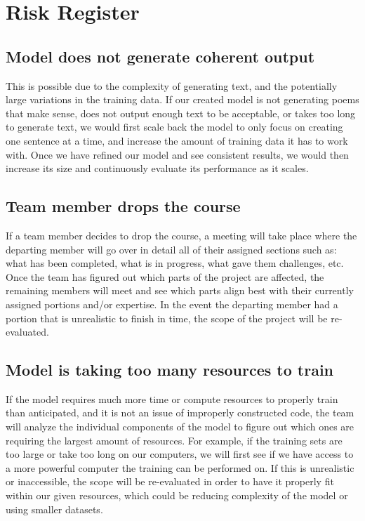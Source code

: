 \documentclass{article} %
\begin{document}
\section{Risk Register}
\label{risk_register}

\subsection{Model does not generate coherent output}

This is possible due to the complexity of generating text, and the potentially large variations in the training data. If our created model is not generating poems that make sense, does not output enough text to be acceptable, or takes too long to generate text, we would first scale back the model to only focus on creating one sentence at a time, and increase the amount of training data it has to work with. Once we have refined our model and see consistent results, we would then increase its size and continuously evaluate its performance as it scales.

\subsection{Team member drops the course}

If a team member decides to drop the course, a meeting will take place where the departing member will go over in detail all of their assigned sections such as: what has been completed, what is in progress, what gave them challenges, etc. Once the team has figured out which parts of the project are affected, the remaining members will meet and see which parts align best with their currently assigned portions and/or expertise. In the event the departing member had a portion that is unrealistic to finish in time, the scope of the project will be re-evaluated.

\subsection{Model is taking too many resources to train}

If the model requires much more time or compute resources to properly train than anticipated, and it is not an issue of improperly constructed code, the team will analyze the individual components of the model to figure out which ones are requiring the largest amount of resources. For example, if the training sets are too large or take too long on our computers, we will first see if we have access to a more powerful computer the training can be performed on. If this is unrealistic or inaccessible, the scope will be re-evaluated in order to have it properly fit within our given resources, which could be reducing complexity of the model or using smaller datasets.
\end{document}
